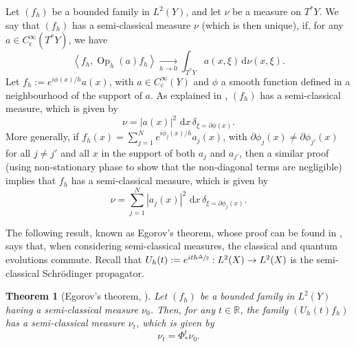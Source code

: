 \documentclass[10pt]{amsart}
\newcommand{\rc}{\mathrm{c}}
\newcommand{\rd}{\,\mathrm{d}}
\DeclareMathOperator{\Op}{Op}
\theoremstyle{plain}
\newtheorem{theorem}{Theorem}[section]
\theoremstyle{definition}
\newcommand{\R}{\mathbb{R}}
\begin{document}
\begin{appendix}
Let $(f_h)$ be a bounded family in $L^2(Y)$, and let $\nu$ be a measure on $T^*Y$. We say that $(f_h)$ has a semi-classical measure $\nu$ (which is then unique), if, for any $a\in C_\rc^\infty(T^*Y)$, we have\vspace*{-3pt}
\[
\left\langle f_h, \Op_h(a) f_h \right\rangle \xrightarrow[h \to 0]{} \int_{T^*Y} a(x,\xi) \rd \nu(x,\xi).
\]
Let $f_h:= e^{i\phi(x)/h} a(x)$, with $a\in C_\rc^\infty(Y)$ and $\phi$ a smooth function defined in a neighbourhood of the support of $a$. As explained in \cite[\S 5.1, Ex.\,2]{Zworski_2012}, $(f_h)$ has a semi-classical measure, which is given by\vspace*{-3pt}
\begin{equation*}
\nu = |a(x)|^2 \,\rd x\, \delta_{\xi= \partial \phi(x)}.
\end{equation*}
More generally, if $f_h(x) = \sum_{j=1}^N e^{i\phi_j(x)/h} a_{j}(x)$, with $\partial \phi_j(x) \neq \partial \phi_{j'}(x)$ for all $j\neq j'$ and all $x$ in the support of both $a_j$ and $a_{j'}$, then a similar proof (using non-stationary phase to show that the non-diagonal terms are negligible) implies that $f_h$ has a semi-classical measure, which is given by
\begin{equation}\label{eq:semi-classical_measure}
\nu = \sum_{j=1}^N |a_j(x)|^2 \,\rd x\, \delta_{\xi= \partial \phi_j(x)}.
\end{equation}

The following result, known as Egorov's theorem, whose proof can be found in \hbox{\cite[\S 15]{Zworski_2012}}, says that, when considering semi-classical measures, the classical and quantum evolutions commute. Recall that $U_h(t):=e^{ith\sfrac{\Delta}{2}}:L^2(X)\to L^2(X)$ is the semi-classical Schrödinger propagator.

\begin{theorem}[Egorov's theorem, {\cite[Th.\,15.2]{Zworski_2012}}]\label{t:Egorov}
Let $(f_h)$ be a bounded family in $L^2(Y)$ having a semi-classical measure $\nu_0$. Then, for any $t\in \R$, the family $\left(U_h(t) f_h \right)$ has a semi-classical measure $\nu_t$, which is given by\vspace*{-3pt}
\[
\nu_t = \Phi^t_* \nu_0.
\]
\end{theorem}


\end{appendix}
\end{document}
